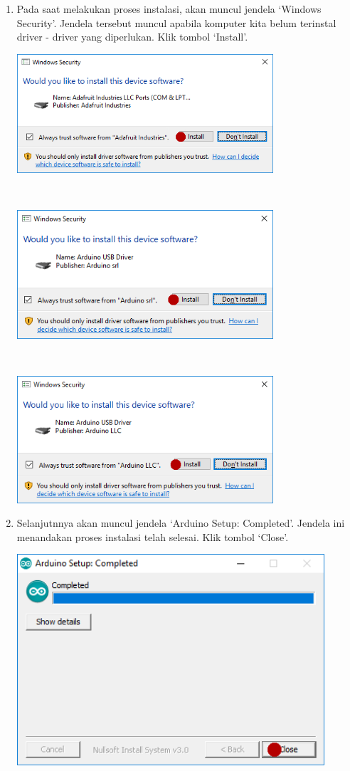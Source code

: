 \begin{enumerate}
\item Pada saat melakukan proses instalasi, akan muncul jendela `Windows Security'. Jendela tersebut muncul apabila komputer kita belum terinstal driver - driver yang diperlukan. Klik tombol `Install'.
\break\\
\centerline{\includegraphics[width=0.75\textwidth]{figures/aride5.png}}
\break\\
\centerline{\includegraphics[width=0.75\textwidth]{figures/aride6.png}}
\break\\
\centerline{\includegraphics[width=0.75\textwidth]{figures/aride7.png}}
\item Selanjutnnya akan muncul jendela `Arduino Setup: Completed'. Jendela ini menandakan proses instalasi telah selesai. Klik tombol `Close'.
\break\\
\centerline{\includegraphics[width=0.9\textwidth]{figures/aride10.png}}

\end{enumerate}
